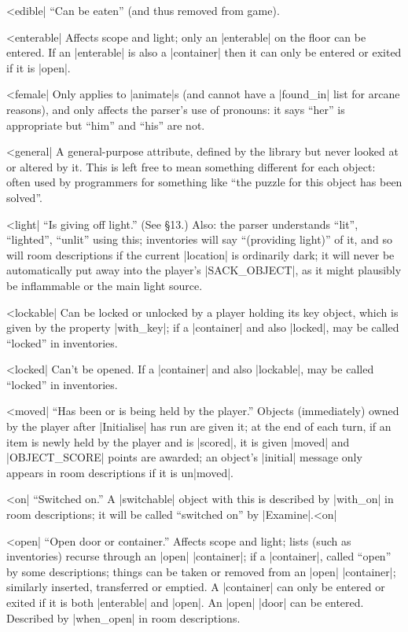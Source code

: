 {{{^^|edible|
``Can be eaten'' (and thus removed from game).

^^|enterable|
Affects scope and light; only an |enterable| on the floor can be
entered.  If an |enterable| is also a |container| then it can
only be entered or exited if it is |open|.

^^|female|
Only applies to |animate|s (and cannot have
a |found_in| list for arcane reasons), and only affects the parser's
use of pronouns: it says ``her'' is appropriate but ``him'' and ``his''
are not.

^^|general|
A general-purpose attribute, defined by
the library but never looked at or altered by it.  This is left
free to mean something different for each object: often used by
programmers for something like ``the puzzle for this object has been
solved''.

^^|light|
``Is giving off light.''  (See \S 13.)  Also: the parser understands
``lit'', ``lighted'', ``unlit'' using this; inventories will
say ``(providing light)'' of it, and so will room descriptions if the
current |location| is ordinarily dark; it will never be automatically
put away into the player's |SACK_OBJECT|, as it might plausibly be
inflammable or the main light source.

^^|lockable|
Can be locked or unlocked by a player
holding its key object, which is given by the property |with_key|;
if a |container| and also |locked|, may be called ``locked'' in
inventories.

^^|locked|
Can't be opened.   If a |container|
and also |lockable|, may be called ``locked'' in inventories.

^^|moved|
``Has been or is being held by the player.''  Objects
(immediately) owned by the player after |Initialise| has run are given
it; at the end of each turn, if an item is newly held by the player
and is |scored|, it is given |moved| and |OBJECT_SCORE| points are
awarded; an object's |initial| message only appears in room
descriptions if it is un|moved|.

^^|on|
``Switched on.''  A |switchable| object with this
is described by |with_on| in room descriptions; it will be called
``switched on'' by |Examine|.^^|on|\

^^|open|
``Open door or container.''  Affects scope and light; lists (such as
inventories) recurse through an |open| |container|; if a |container|, called
``open'' by some descriptions; things can be taken or removed from an |open|
|container|; similarly inserted, transferred or emptied.  A |container| can
only be entered or exited if it is both |enterable| and |open|.  An |open|
|door| can be entered.  Described by |when_open| in room descriptions.

}}}
